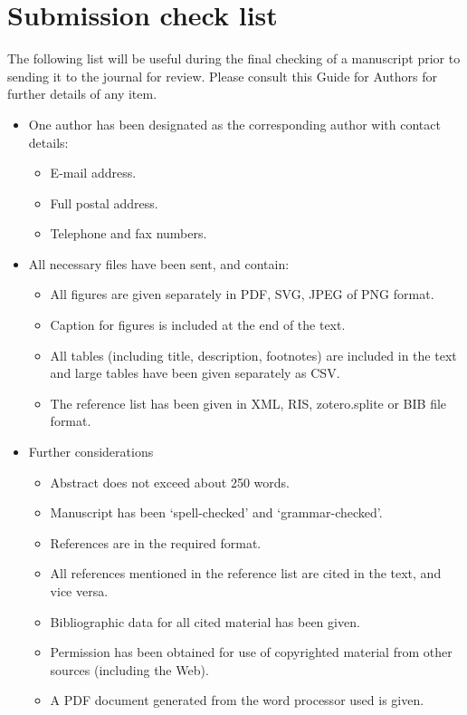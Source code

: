 \section*{Submission check list}

The following list will be useful during the final checking of a manuscript prior to sending it to the journal for review. Please consult this Guide for Authors for further details of any item.

\vspace{0.5ex}
\begin{itemize}
\item One author has been designated as the corresponding author with contact details:
\begin{itemize}
\item E-mail address.
\item Full postal address.
\item Telephone and fax numbers.
\end{itemize}

\item All necessary files have been sent, and contain:
\begin{itemize}
\item All figures are given separately in PDF, SVG, JPEG of PNG format.
\item Caption for figures is included at the end of the text.
\item All tables (including title, description, footnotes) are included in the text and large tables have been given separately as CSV.
\item The reference list has been given in XML, RIS, zotero.splite or BIB file format.
\end{itemize}

\item Further considerations
\begin{itemize}
\item Abstract does not exceed about 250 words.
\item Manuscript has been `spell-checked' and `grammar-checked'.
\item References are in the required format.
\item All references mentioned in the reference list are cited in the text, and vice versa.
\item Bibliographic data for all cited material has been given.
\item Permission has been obtained for use of copyrighted material from other sources (including the Web).
\item A PDF document generated from the word processor used is given.
\end{itemize}
\end{itemize}


